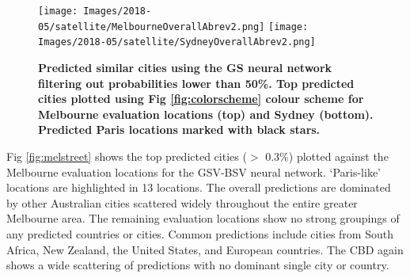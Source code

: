 \documentclass[Crown,sageh,times]{sagej}
\begin{document}
\begin{figure}[!htbp]
\centering   
\texttt{[image: Images/2018-05/satellite/MelbourneOverallAbrev2.png]} 
\texttt{[image: Images/2018-05/satellite/SydneyOverallAbrev2.png]}  
\caption{  \bf Predicted similar cities using the GS neural network filtering out probabilities lower than 50\%. Top predicted cities plotted using Fig \ref{fig:colorscheme} colour scheme for Melbourne evaluation locations (top) and Sydney (bottom). Predicted Paris locations marked with black stars.}    
 \label{fig:melsat2}  
\end{figure} 

Fig \ref{fig:melstreet} shows the top predicted cities ($>$ 0.3\%) plotted against the Melbourne evaluation locations for the GSV-BSV neural network. `Paris-like' locations are highlighted in 13 locations. The overall predictions are dominated by other Australian cities scattered widely throughout the entire greater Melbourne area. The remaining evaluation locations show no strong groupings of any predicted countries or cities. Common predictions include cities from South Africa, New Zealand, the United States, and European countries. The CBD again shows a wide scattering of predictions with no dominant single city or country.
\end{document}
